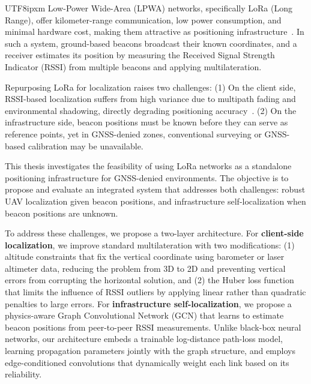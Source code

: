 \documentclass[a4paper,10pt,twocolumn]{article}
\begin{document}
\begin{CJK}{UTF8}{ipxm}
Low-Power Wide-Area (LPWA) networks, specifically LoRa (Long Range), offer kilometer-range communication, low power consumption, and minimal hardware cost, making them attractive as positioning infrastructure~\cite{ref_lpwan_survey}.
In such a system, ground-based beacons broadcast their known coordinates, and a receiver estimates its position by measuring the Received Signal Strength Indicator (RSSI) from multiple beacons and applying multilateration.

Repurposing LoRa for localization raises two challenges:
(1) On the client side, RSSI-based localization suffers from high variance due to multipath fading and environmental shadowing, directly degrading positioning accuracy~\cite{goldoni2019lora}.
(2) On the infrastructure side, beacon positions must be known before they can serve as reference points, yet in GNSS-denied zones, conventional surveying or GNSS-based calibration may be unavailable.

This thesis investigates the feasibility of using LoRa networks as a standalone positioning infrastructure for GNSS-denied environments.
The objective is to propose and evaluate an integrated system that addresses both challenges: robust UAV localization given beacon positions, and infrastructure self-localization when beacon positions are unknown.

To address these challenges, we propose a two-layer architecture.
For \textbf{client-side localization}, we improve standard multilateration with two modifications: (1) altitude constraints that fix the vertical coordinate using barometer or laser altimeter data, reducing the problem from 3D to 2D and preventing vertical errors from corrupting the horizontal solution, and (2) the Huber loss function that limits the influence of RSSI outliers by applying linear rather than quadratic penalties to large errors.
For \textbf{infrastructure self-localization}, we propose a physics-aware Graph Convolutional Network (GCN) that learns to estimate beacon positions from peer-to-peer RSSI measurements.
Unlike black-box neural networks, our architecture embeds a trainable log-distance path-loss model, learning propagation parameters jointly with the graph structure, and employs edge-conditioned convolutions that dynamically weight each link based on its reliability.


\end{CJK}
\end{document}
